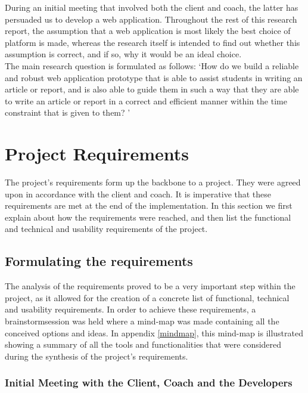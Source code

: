 During an initial meeting that involved both the client and coach, the latter has persuaded us to develop a web application. Throughout the rest of this research report, the assumption that a web application is most likely the best choice of platform is made, whereas the research itself is intended to find out whether this assumption is correct, and if so, why it would be an ideal choice. \\

The main research question is formulated as follows: `How do we build a reliable and robust web application prototype that is able to assist students in writing an article or report, and is also able to guide them in such a way that they are able to write an article or report in a correct and efficient manner within the time constraint that is given to them? '

\section{Project Requirements}
\label{req}

The project's requirements form up the backbone to a project. They were agreed upon in accordance with the client and coach. It is imperative that these requirements are met at the end of the implementation. In this section we first explain about how the requirements were reached, and then list the functional and technical and usability requirements of the project.

\subsection{Formulating the requirements} %
\label{sub:subsection_name}
The analysis of the requirements proved to be a very important step within the project, as it allowed for the creation of a concrete list of functional, technical and usability requirements. In order to achieve these requirements, a brainstormsession was held where a mind-map was made containing all the conceived options and ideas. In appendix \ref{mindmap}, this mind-map is illustrated showing a summary of all the tools and functionalities that were considered during the synthesis of the project's requirements.


\subsubsection{Initial Meeting with the Client, Coach and the Developers} %
\label{sub:meeting_client_coach_developer_team_meeting_}

